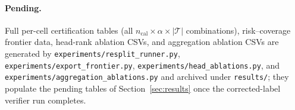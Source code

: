 \documentclass{article}
\begin{document}
\paragraph{Pending.}
Full per-cell certification tables (all $n_{\mathrm{cal}}\times\alpha
\times|\mathcal{T}|$ combinations), risk--coverage frontier data,
head-rank ablation CSVs, and aggregation ablation CSVs are generated
by \texttt{experiments/resplit\_runner.py},
\texttt{experiments/export\_frontier.py},
\texttt{experiments/head\_ablations.py}, and
\texttt{experiments/aggregation\_ablations.py} and archived under
\texttt{results/}; they populate the pending tables of
Section~\ref{sec:results} once the corrected-label verifier run
completes.
\end{document}
